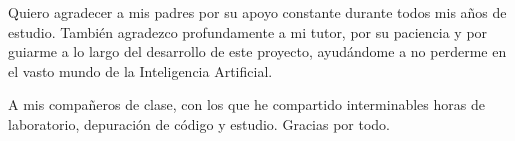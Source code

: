 Quiero agradecer a mis padres por su apoyo constante durante todos mis años de estudio. También agradezco profundamente a mi tutor, por su paciencia y por guiarme a lo largo del desarrollo de este proyecto, ayudándome a no perderme en el vasto mundo de la Inteligencia Artificial.

A mis compañeros de clase, con los que he compartido interminables horas de laboratorio, depuración de código y estudio. Gracias por todo.
